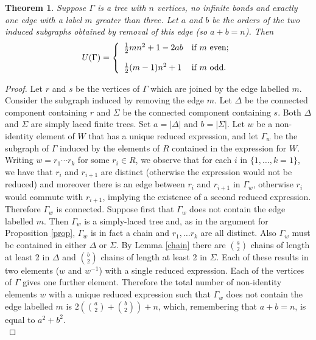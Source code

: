 \documentclass[a4paper,12pt]{article}
\newtheorem{thm}{Theorem}[section]
\theoremstyle{definition}
\begin{document}
\begin{thm}
\label{m}
Suppose $\Gamma$ is a tree with $n$ vertices, no infinite bonds and exactly one edge with a label $m$ greater than three. Let $a$ and $b$ be the orders of the two induced subgraphs obtained by removal of this edge (so $a + b = n$). Then $$U(\Gamma) = \left\{\begin{array}{ll} \textstyle\frac{1}{2}mn^2 + 1 - 2ab   & {\text{if $m$ even;}}\vspace*{4mm}\\
\textstyle\frac{1}{2}(m-1)n^2 + 1  & {\text{if $m$ odd.}}
\end{array}\right.$$
\end{thm}

\begin{proof}
Let $r$ and $s$ be the vertices of $\Gamma$ which are joined by the edge labelled $m$. Consider the subgraph induced by removing the edge $m$. Let $\Delta$ be the connected component containing $r$ and $\Sigma$ be the connected component containing $s$. Both $\Delta$ and $\Sigma$ are simply laced finite trees. Set $a = |\Delta|$ and $b = |\Sigma|$. Let $w$ be a non-identity element of $W$ that has a unique reduced expression, and let $\Gamma_w$ be the subgraph of $\Gamma$ induced by the elements of $R$ contained in the expression for $W$.  Writing $w = r_1\cdots r_k$ for some $r_i \in R$, we observe that for each $i$ in $\{1, \ldots, k=1\}$, we have that $r_i$ and $r_{i+1}$ are distinct (otherwise the expression would not be reduced) and moreover there is an edge between $r_i$ and $r_{i+1}$ in $\Gamma_w$, otherwise $r_i$ would commute with $r_{i+1}$, implying the existence of a second reduced expression. Therefore $\Gamma_w$ is connected. Suppose first that $\Gamma_w$ does not contain the edge labelled $m$. Then $\Gamma_w$ is a simply-laced tree and, as in the argument for Proposition \ref{prop}, $\Gamma_w$ is in fact a chain and $r_1, \ldots r_k$  are all distinct. Also $\Gamma_w$ must be contained in either $\Delta$ or $\Sigma$. By Lemma \ref{chain} there are $\binom{a}{2}$ chains of length at least 2 in $\Delta$ and $\binom{b}{2}$ chains of length at least 2 in $\Sigma$. Each of these results in two elements ($w$ and $w^{-1}$) with a single reduced expression. Each of the vertices of $\Gamma$ gives one further element. Therefore the total number of non-identity elements $w$ with a unique reduced expression such that $\Gamma_w$ does not contain the edge labelled $m$ is $2(\binom{a}{2} + \binom{b}{2}) + n$, which, remembering that $a+b = n$, is equal to $a^2 + b^2$. \\


\end{proof}
\end{document}
